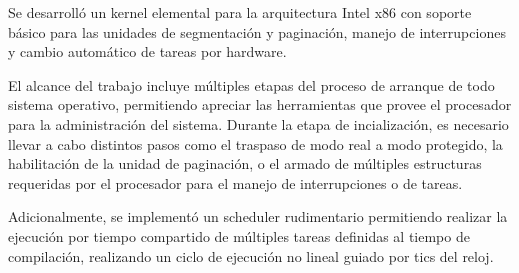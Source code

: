 
Se desarrolló un kernel elemental para la arquitectura Intel x86 con soporte básico para las unidades de segmentación y paginación, manejo de interrupciones y cambio automático de tareas por hardware.

El alcance del trabajo incluye múltiples etapas del proceso de arranque de todo sistema operativo, permitiendo apreciar las herramientas que provee el procesador para la administración del sistema. Durante la etapa de incialización, es necesario llevar a cabo distintos pasos como el traspaso de modo real a modo protegido, la habilitación de la unidad de paginación, o el armado de múltiples estructuras requeridas por el procesador para el manejo de interrupciones o de tareas.

Adicionalmente, se implementó un scheduler rudimentario permitiendo realizar la ejecución por tiempo compartido de múltiples tareas definidas al tiempo de compilación, realizando un ciclo de ejecución no lineal guiado por tics del reloj.
